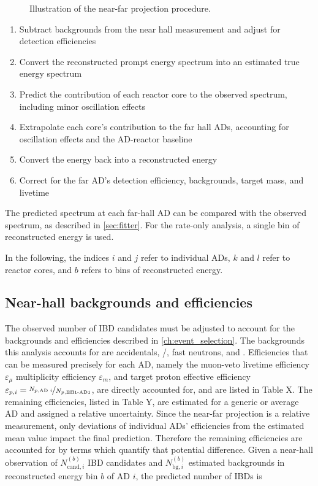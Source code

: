 \begin{figure}
    \caption{Illustration of the near-far projection procedure.}
    \label{fig:near_far_cartoon}
\end{figure}

\begin{enumerate}
    \item Subtract backgrounds from the near hall measurement
        and adjust for detection efficiencies
    \item Convert the reconstructed prompt energy spectrum
        into an estimated true \nuebar{} energy spectrum
    \item Predict the contribution of each reactor core
        to the observed \nuebar{} spectrum,
        including minor oscillation effects
    \item Extrapolate each core's contribution to the far hall ADs,
        accounting for oscillation effects and the AD-reactor baseline
    \item Convert the \nuebar{} energy back into a reconstructed energy
    \item Correct for the far AD's detection efficiency, backgrounds,
        target mass, and livetime
\end{enumerate}
The predicted spectrum at each far-hall AD can be compared
with the observed spectrum, as described in \cref{sec:fitter}.
For the rate-only analysis, a single bin of reconstructed energy is used.

In the following, the indices $i$ and $j$ refer to individual ADs,
$k$ and $l$ refer to reactor cores,
and $b$ refers to bins of reconstructed energy.

\subsection{Near-hall backgrounds and efficiencies}
\label{subsec:near_bg_eff}

The observed number of IBD candidates must be adjusted
to account for the backgrounds and efficiencies described in \cref{ch:event_selection}.
The backgrounds this analysis accounts for are
accidentals, \li{}/\he{}, fast neutrons, and \amc{}.
Efficiencies that can be measured precisely for each AD,
namely
the muon-veto livetime efficiency $\varepsilon_\mu$
multiplicity efficiency $\varepsilon_m$,
and target proton effective efficiency
$\varepsilon_{p,i}=\nicefrac{N_{p,\text{AD }i}}{N_{p,\text{EH1-AD1}}}$,
are directly accounted for,
and are listed in Table X.
The remaining efficiencies, listed in Table Y,
are estimated for a generic or average AD and assigned a relative uncertainty.
Since the near-far projection is a relative measurement,
only deviations of individual ADs' efficiencies from the estimated mean value
impact the final prediction.
Therefore the remaining efficiencies are accounted for
by terms which quantify that potential difference.
Given a near-hall observation of $N_{\text{cand},i}^{(b)}$ IBD candidates
and $N_{\text{bg},i}^{(b)}$ estimated backgrounds in reconstructed energy bin $b$
of AD $i$,
the predicted number of IBDs is

